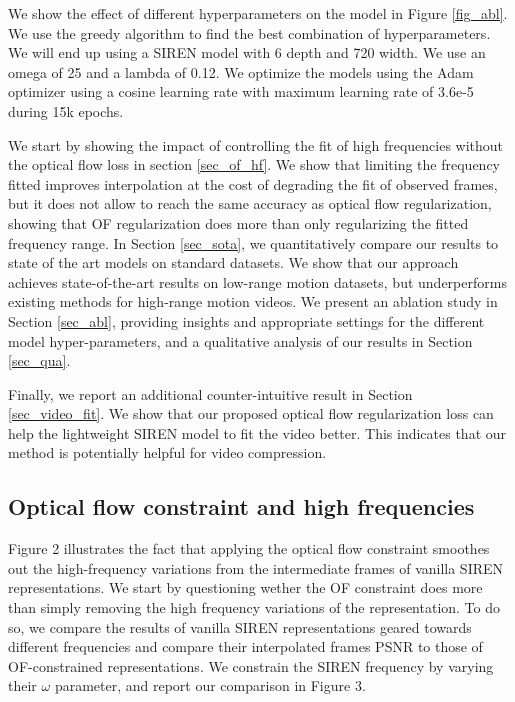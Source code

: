 \documentclass{article}
\begin{document}
We show the effect of different hyperparameters on the model in Figure \ref{fig_abl}.
We use the greedy algorithm to find the best combination of hyperparameters.
We will end up using a SIREN model with 6 depth and 720 width.
We use an omega of 25 and a lambda of 0.12.
We optimize the models using the Adam optimizer using a cosine learning rate with maximum learning rate of 3.6e-5 during 15k epochs.

We start by showing the impact of controlling the fit of high frequencies without the optical flow loss in section \ref{sec_of_hf}.
We show that limiting the frequency fitted improves interpolation at the cost of degrading the fit of observed frames,
but it does not allow to reach the same accuracy as optical flow regularization,
showing that OF regularization does more than only regularizing the fitted frequency range.
In Section \ref{sec_sota}, we quantitatively compare our results to state of the art models on standard datasets.
We show that our approach achieves state-of-the-art results on low-range motion datasets,
but underperforms existing methods for high-range motion videos.
We present an ablation study in Section \ref{sec_abl},
providing insights and appropriate settings for the different model hyper-parameters,
and a qualitative analysis of our results in Section \ref{sec_qua}.

Finally, we report an additional counter-intuitive result in Section \ref{sec_video_fit}.
We show that our proposed optical flow regularization loss can help the lightweight SIREN model to fit the video better.
This indicates that our method is potentially helpful for video compression.

\subsection{Optical flow constraint and high frequencies}

Figure 2 illustrates the fact that applying the optical flow constraint smoothes out the high-frequency variations
from the intermediate frames of vanilla SIREN representations.
We start by questioning wether the OF constraint does more than simply removing the high frequency variations of the representation.
To do so, we compare the results of vanilla SIREN representations geared towards different frequencies and compare
their interpolated frames PSNR to those of OF-constrained representations.
We constrain the SIREN frequency by varying their $\omega$ parameter,
and report our comparison in Figure 3.
\end{document}
